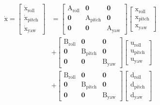 \documentclass[3p,times]{elsarticle}
\begin{document}
\begin{equation}
	\begin{split}
		\boldsymbol{{\mathrm{\dot x}}} = \begin{bmatrix}
			\boldsymbol{{\mathrm{\dot x_{\text{roll}}}}}\\
			\boldsymbol{{\mathrm{\dot x_{\text{pitch}}}}}\\
			\boldsymbol{{\mathrm{\dot x_{\text{yaw}}}}}
		\end{bmatrix} &= \begin{bmatrix}
			\boldsymbol{{\mathrm{A_{\text{roll}}}}} & \boldsymbol{0} & \boldsymbol{0}\\
			\boldsymbol{0} & \boldsymbol{{\mathrm{A_{\text{pitch}}}}} & \boldsymbol{0} \\
			\boldsymbol{0} & \boldsymbol{0} & \boldsymbol{{\mathrm{A_{\text{yaw}}}}}
		\end{bmatrix} \begin{bmatrix}
			\boldsymbol{{\mathrm{x_{\text{roll}}}}}\\
			\boldsymbol{{\mathrm{x_{\text{pitch}}}}}\\
			\boldsymbol{{\mathrm{x_{\text{yaw}}}}}
		\end{bmatrix}
		\\[1em]
		& + \begin{bmatrix}
			\boldsymbol{{\mathrm{B_{\text{roll}}}}} & \boldsymbol{0} & \boldsymbol{0}\\
			\boldsymbol{0} & \boldsymbol{{\mathrm{B_{\text{pitch}}}}} & \boldsymbol{0} \\
			\boldsymbol{0} & \boldsymbol{0} & \boldsymbol{{\mathrm{B_{\text{yaw}}}}}
		\end{bmatrix}
		\begin{bmatrix}
			\boldsymbol{{\mathrm{u_{\text{roll}}}}}\\
			\boldsymbol{{\mathrm{u_{\text{pitch}}}}}\\
			\boldsymbol{{\mathrm{u_{\text{yaw}}}}}
		\end{bmatrix}\\[1em]
		& + \begin{bmatrix}
			\boldsymbol{{\mathrm{B_{\text{roll}}}}} & \boldsymbol{0} & \boldsymbol{0}\\
			\boldsymbol{0} & \boldsymbol{{\mathrm{B_{\text{pitch}}}}} & \boldsymbol{0} \\
			\boldsymbol{0} & \boldsymbol{0} & \boldsymbol{{\mathrm{B_{\text{yaw}}}}}
		\end{bmatrix} \begin{bmatrix}
			\boldsymbol{{\mathrm{d_{\text{roll}}}}}\\
			\boldsymbol{{\mathrm{d_{\text{pitch}}}}}\\
			\boldsymbol{{\mathrm{d_{\text{yaw}}}}}
		\end{bmatrix}
	\end{split}
\end{equation}
\end{document}
